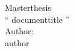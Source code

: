 \begin{titlepage}
\thispagestyle{empty}
\begin{center}
    Masterthesis\\[0.5in]
    {\Huge\enquote{ documenttitle }}\\[2in]
    
    Author:\\author\\

\end{center}
\end{titlepage}